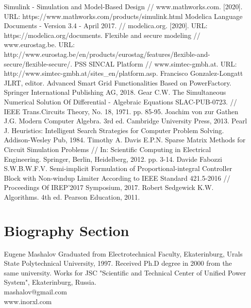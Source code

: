 \documentclass[lettersize,journal]{IEEEtran}
\begin{document}
\begin{thebibliography}{1}

Simulink - Simulation and Model-Based Design // www.mathworks.com. [2020]. URL: https://www.mathworks.com/products/simulink.html
Modelica Language Documents - Version 3.4 - April 2017. // modelica.org. [2020]. URL: https://modelica.org/documents. 
Flexible and secure modeling // www.eurostag.be. URL: http://www.eurostag.be/en/products/eurostag/features/flexible-and-secure/flexible-secure/.
PSS SINCAL Platform // www.simtec-gmbh.at. URL: http://www.simtec-gmbh.at/sites\_en/platform.asp.
Francisco Gonzalez-Longatt JLRT, editor. Advanced Smart Grid Functionalities Based on PowerFactory. Springer International Publishing AG, 2018.
Gear C.W. The Simultaneous Numerical Solution Of Differential - Algebraic Equations SLAC-PUB-0723. // IEEE Trans.Circuits Theory, No. 18, 1971. pp. 85-95.
Joachim von zur Gathen J.G. Modern Computer Algebra. 3rd ed. Cambridge University Press, 2013.
Pearl J. Heuristics: Intelligent Search Strategies for Computer Problem Solving. Addison-Wesley Pub, 1984.
Timothy A. Davis E.P.N. Sparse Matrix Methods for Circuit Simulation Problems // In: Scientific Computing in Electrical Engineering. Springer, Berlin, Heidelberg, 2012. pp. 3-14.
Davide Fabozzi S.W.B.W.F.V. Semi-implicit Formulation of Proportional-integral Controller Block with Non-windup Limiter According to IEEE Standard 421.5-2016 // Proceedings Of IREP'2017 Symposium, 2017.
Robert Sedgewick K.W. Algorithms. 4th ed. Pearson Education, 2011.



\end{thebibliography}
\section{Biography Section}
\vspace{-33pt}
\begin{IEEEbiography}{Eugene Mashalov}
Graduated from Electrotechnical Faculty, Ekaterinburg, Urals State Polytechnical University, 1997. 
Received Ph.D degree in 2000 from the same university. 
Works for JSC "Scientific and Technical Center of Unified Power System", Ekaterinburg, Russia.\\
mashalov@gmail.com \\
www.inorxl.com
\end{IEEEbiography}
\vfill
\end{document}
